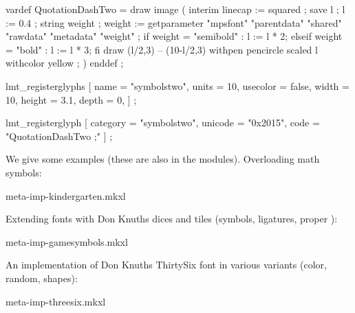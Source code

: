 \typebuffer[font] \getbuffer[font]

\getbuffer[demo]

\page

\typebuffer[mpone][style=\tt\small\small]

\page

\startbuffer[mptwo]

    vardef QuotationDashTwo =
        draw image (
            interim linecap := squared ;
            save l ; l := 0.4 ;
            string weight ; weight := getparameter "mpsfont" "parentdata" "shared" "rawdata" "metadata" "weight" ;
            if     weight = "semibold" : l := l * 2;
            elseif weight = "bold"     : l := l * 3; fi
            draw (l/2,3) -- (10-l/2,3) withpen pencircle scaled l
            withcolor yellow ;
        )
    enddef ;

    lmt_registerglyphs [
        name     = "symbolstwo",
        units    = 10,
        usecolor = false,
        width    = 10,
        height   = 3.1,
        depth    = 0,
    ] ;

    lmt_registerglyph [
        category = "symbolstwo",
        unicode  = "0x2015",
        code     = "QuotationDashTwo ;"
    ] ;

\stopMPcalculation
\stopbuffer

\getbuffer[mptwo]

\startbuffer[font]

\stopbuffer

\typebuffer[font] \getbuffer[font]

\getbuffer[demo]

\page

\typebuffer[mptwo][style=\tt\small\small]

\stoptitle

\starttitle[title=More examples]

We give some examples (these are also in the modules). Overloading math
symbols:

\starttyping
meta-imp-kindergarten.mkxl
\stoptyping

Extending fonts with Don Knuths dices and tiles (symbols, ligatures, proper
\UNICODE):

\starttyping
meta-imp-gamesymbols.mkxl
\stoptyping

An implementation of Don Knuths ThirtySix font in various variants (color,
random, shapes):

\starttyping
meta-imp-threesix.mkxl
\stoptyping

\stopdocument
